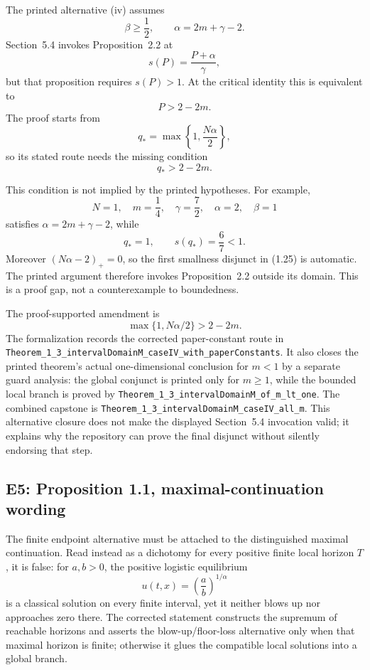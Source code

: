 \documentclass[11pt]{article}
\newcommand{\code}[1]{\nolinkurl{#1}}
\begin{document}
The printed alternative (iv) assumes
\[
  \beta\ge\frac12,\qquad \alpha=2m+\gamma-2.
\]
Section~5.4 invokes Proposition~2.2 at
\[
  s(P)=\frac{P+\alpha}{\gamma},
\]
but that proposition requires \(s(P)>1\).  At the critical identity this is
equivalent to
\[
  P>2-2m.
\]
The proof starts from
\[
  q_*=\max\left\{1,\frac{N\alpha}{2}\right\},
\]
so its stated route needs the missing condition
\[
  \boxed{q_*>2-2m.}
\]

This condition is not implied by the printed hypotheses.  For example,
\[
  N=1,\quad m=\frac14,\quad\gamma=\frac72,\quad
  \alpha=2,\quad\beta=1
\]
satisfies \(\alpha=2m+\gamma-2\), while
\[
  q_*=1,\qquad s(q_*)=\frac67<1.
\]
Moreover \((N\alpha-2)_+=0\), so the first smallness disjunct in (1.25) is
automatic.  The printed argument therefore invokes Proposition~2.2 outside
its domain.  This is a proof gap, not a counterexample to boundedness.

The proof-supported amendment is
\[
  \max\{1,N\alpha/2\}>2-2m.
\]
The formalization records the corrected paper-constant route in
\code{Theorem_1_3_intervalDomainM_caseIV_with_paperConstants}.  It also closes
the printed theorem's actual one-dimensional conclusion for \(m<1\) by a
separate guard analysis: the global conjunct is printed only for \(m\ge1\),
while the bounded local branch is proved by
\code{Theorem_1_3_intervalDomainM_of_m_lt_one}.  The combined capstone is
\code{Theorem_1_3_intervalDomainM_caseIV_all_m}.  This alternative closure
does not make the displayed Section~5.4 invocation valid; it explains why
the repository can prove the final disjunct without silently endorsing that
step.

\subsection{E5: Proposition 1.1, maximal-continuation wording}

The finite endpoint alternative must be attached to the distinguished maximal
continuation.  Read instead as a dichotomy for every positive finite local
horizon \(T\), it is false: for \(a,b>0\), the positive logistic equilibrium
\[
  u(t,x)=\left(\frac ab\right)^{1/\alpha}
\]
is a classical solution on every finite interval, yet it neither blows up nor
approaches zero there.  The corrected statement constructs the supremum of
reachable horizons and asserts the blow-up/floor-loss alternative only when
that maximal horizon is finite; otherwise it glues the compatible local
solutions into a global branch.
\end{document}
